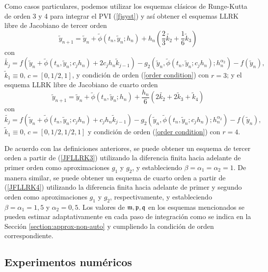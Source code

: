 Como casos particulares, podemos utilizar los esquemas clásicos de Runge-Kutta de orden 3 y 4 para integrar el PVI (\ref{fjsyst}) y así obtener el esquemas LLRK libre de Jacobiano de tercer orden
\begin{equation}
    \widetilde{y}_{n+1}=\widetilde{y}_n+\widetilde{\phi}(t_n,\widetilde{y}_n;h_n) + h_n(\frac{2}{3}\widetilde{k_2}+\frac{1}{6}\widetilde{k}_3) \label{JFLLRK3}
\end{equation}
con
\begin{equation*}
    \widetilde{k_j}=f(\widetilde{y}_n+\widetilde{\phi}(t_n,\widetilde{y}_n;c_jh_n)+2c_jh_n\widetilde{k}_{j-1})-g_2(\widetilde{y}_n,\widetilde{\phi}(t_n,\widetilde{y}_n;c_jh_n);h^{\alpha_2}_n)-f(\widetilde{y}_n),
\end{equation*}
$\widetilde{k}_1\equiv 0$, $c=[0,1/2,1]$, y condición de orden  (\ref{order condition}) con $r=3$; y el esquema LLRK libre de Jacobiano de cuarto orden
\begin{equation}
    \widetilde{y}_{n+1}=\widetilde{y}_n+\widetilde{\phi}(t_n,\widetilde{y}_n;h_n) + \frac{h_n}{6}(2\widetilde{k_2}+2\widetilde{k}_3+\widetilde{k}_4) \label{JFLLRK4}
\end{equation}
con
\begin{equation*}
    \widetilde{k_j}=f(\widetilde{y}_n+\widetilde{\phi}(t_n,\widetilde{y}_n;c_jh_n)+c_jh_n\widetilde{k}_{j-1})-g_2(\widetilde{y}_n,\widetilde{\phi}(t_n,\widetilde{y}_n;c_jh_n);h^{\alpha_2}_n)-f(\widetilde{y}_n),
\end{equation*}
$\widetilde{k}_1\equiv 0$, $c=[0,1/2,1/2,1]$ y condición de orden  (\ref{order condition}) con $r=4$.

De acuerdo con las definiciones anteriores, se puede obtener un esquema de tercer orden a partir de (\ref{JFLLRK3}) utilizando la diferencia finita hacia adelante de primer orden como aproximaciones $g_1$ y $g_2$, y estableciendo $\beta=\alpha_1 =\alpha_2=1$. De manera similar, se puede obtener un esquema de cuarto orden a partir de (\ref{JFLLRK4}) utilizando la diferencia finita hacia adelante de primer y segundo orden como aproximaciones $g_1$ y $g_2$, respectivamente, y estableciendo $\beta= \alpha_1=1,5$ y $\alpha_2=0,5$. Los valores de $\mathfrak{m},\mathfrak{p},\mathfrak{q}$ en los esquemas mencionados se pueden estimar adaptativamente en cada paso de integración como se indica en la Sección \ref{section:approx-non-auto} y cumpliendo la condición de orden correspondiente.

\subsection{Experimentos numéricos}

